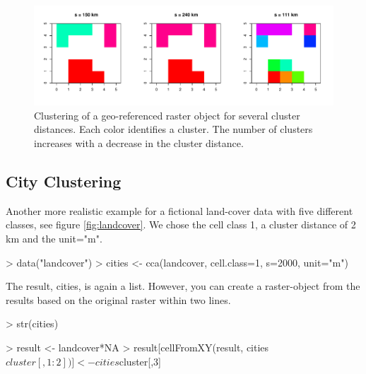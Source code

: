 \documentclass[10pt,a4paper]{article}
\begin{document}
\begin{figure}
\centering
\includegraphics[width=\textwidth]{pics/raster.pdf}
\caption{Clustering of a geo-referenced raster object for several cluster distances. Each color identifies a cluster. The number of clusters increases with a decrease in the cluster distance.}
\label{fig:raster}
\end{figure}

\subsection{City Clustering}
Another more realistic example for a fictional land-cover data with five different classes, see figure \ref{fig:landcover}. We chose the cell class 1, a cluster distance of 2 km and the unit="m".

\begin{Schunk}
\begin{Sinput}
> data("landcover")
> cities <- cca(landcover, cell.class=1, s=2000, unit="m")
\end{Sinput}
\end{Schunk}

The result, cities, is again a list. However, you can create a raster-object from the results based on the original raster within two lines.

\begin{Schunk}
\begin{Sinput}
> str(cities)
\end{Sinput}
\begin{Sinput}
> result <- landcover*NA
> result[cellFromXY(result, cities$cluster[,1:2])] <- cities$cluster[,3]
\end{Sinput}
\end{Schunk}
\end{document}
